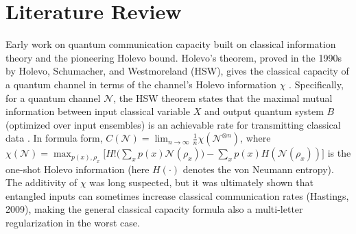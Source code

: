 \documentclass[11pt]{article}
\theoremstyle{plain}
\theoremstyle{definition}
\numberwithin{equation}{section}
\begin{document}
\section*{Literature Review}
Early work on quantum communication capacity built on classical information theory and the pioneering Holevo bound. Holevo’s theorem, proved in the 1990s by Holevo, Schumacher, and Westmoreland (HSW), gives the classical capacity of a quantum channel in terms of the channel’s Holevo information $\chi$ \cite{33}. Specifically, for a quantum channel $\mathcal{N}$, the HSW theorem states that the maximal mutual information between input classical variable $X$ and output quantum system $B$ (optimized over input ensembles) is an achievable rate for transmitting classical data \cite{33}. In formula form, $C(\mathcal{N}) = \lim_{n\to\infty}\frac{1}{n}\chi(\mathcal{N}^{\otimes n})$, where $\chi(\mathcal{N}) = \max_{{p(x),\rho_x}} \Big[ H!\big(\sum_x p(x)\mathcal{N}(\rho_x)\big) - \sum_x p(x) H(\mathcal{N}(\rho_x)) \Big]$ is the one-shot Holevo information (here $H(\cdot)$ denotes the von Neumann entropy). The additivity of $\chi$ was long suspected, but it was ultimately shown that entangled inputs can sometimes increase classical communication rates (Hastings, 2009), making the general classical capacity formula also a multi-letter regularization in the worst case.
\end{document}
